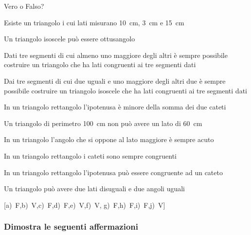 \begin{esercizio}
\label{ese:3.82}
Vero o Falso? 
\begin{enumeratea}
\item Esiste un triangolo i cui lati misurano 10~cm, 3~cm e 
15~cm\hfill\boxV\quad\boxF
\item Un triangolo isoscele può essere 
ottusangolo\hfill\boxV\quad\boxF
\item Dati tre segmenti di cui almeno uno maggiore degli altri è 
sempre possibile costruire un triangolo che ha lati congruenti ai tre 
segmenti dati\hfill\boxV\quad\boxF
\item Dai tre segmenti di cui due uguali e uno maggiore degli altri 
due è sempre possibile costruire un triangolo isoscele che ha lati 
congruenti ai tre segmenti dati\hfill\boxV\quad\boxF
\item In un triangolo rettangolo l'ipotenusa è minore della somma dei 
due cateti\hfill\boxV\quad\boxF
\item Un triangolo di perimetro 100~cm non può avere un lato di 
60~cm\hfill\boxV\quad\boxF
\item In un triangolo l'angolo che si oppone al lato maggiore è 
sempre acuto\hfill\boxV\quad\boxF
\item In un triangolo rettangolo i cateti sono sempre 
congruenti\hfill\boxV\quad\boxF
\item In un triangolo rettangolo l'ipotenusa può essere congruente ad 
un cateto\hfill\boxV\quad\boxF
\item Un triangolo può avere due lati disuguali e due angoli 
uguali\hfill\boxV\quad\boxF
\end{enumeratea}
\hfill [a)~F,\quad b)~V,\quad c)~F,\quad d)~F,\quad e)~V,\quad f)~V,\quad 
g)~F,\quad h)~F,\quad i)~F,\quad j)~V]
\end{esercizio}

\subsubsection*{Dimostra le seguenti affermazioni}

